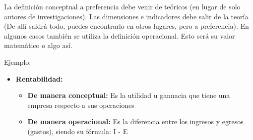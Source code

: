 La definición conceptual a preferencia debe venir de teóricos (en lugar de solo autores de investigaciones).
Las dimensiones e indicadores debe salir de la teoría (De allí saldrá todo, puedes encontrarlo en otros lugares, pero a preferencia). En algunos casos también se utiliza la definición operacional. Esto será su valor matemático o algo así.

Ejemplo:
\begin{itemize}
    \item \textbf{Rentabilidad:}
    \begin{itemize}
        \item \textbf{De manera conceptual:} Es la utilidad u gannacia que tiene una empresa respecto a sus operaciones
        \item \textbf{De manera operacional:} Es la diferencia entre los ingresos  y egresos (gastos), siendo su fórmula: I - E
    \end{itemize}
\end{itemize}
